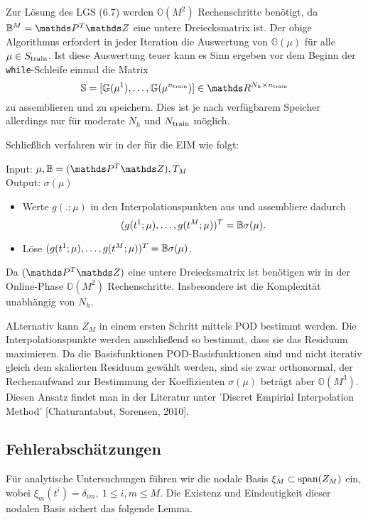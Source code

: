 Zur Lösung des LGS (6.7) werden $\mathbb{O}(M^2)$ Rechenschritte benötigt, da $\mathbb{B}^M = \Pw^T\Z$ eine untere Dreiecksmatrix ist.
Der obige Algorithmus erfordert in jeder Iteration die Auswertung von $\mathbb{G}(\mu)$ für alle $\mu\in S_{\operatorname{train}}$.
Ist diese Auswertung teuer kann es Sinn ergeben vor dem Beginn der \texttt{while}-Schleife einmal die Matrix
\[
\mathbb{S} = [\mathbb{G}(\mu^1)\dt{,}\mathbb{G}(\mu^{n_{\train}})] \in \R^{N_h\times n_{\train}}
\]
zu assemblieren und zu speichern.
Dies ist je nach verfügbarem Speicher allerdings nur für moderate $N_h$ und $N_{\operatorname{train}}$ möglich.

Schließlich verfahren wir in der  für die EIM wie folgt:

Input: $\mu, \mathbb{B} = (\Pw^T\Z), T_M$\\
Output: $\sigma(\mu)$\\
\begin{itemize}
	\item Werte $g(.;\mu)$ in den Interpolationspunkten aus und assembliere dadurch
	\[
	(g(t^1;\mu), \dots ,g(t^M;\mu))^T = \mathbb{B}\sigma(\mu).
	\]
	\item Löse $(g(t^1;\mu), \dots ,g(t^M;\mu))^T = \mathbb{B}\sigma(\mu)$.
\end{itemize}

Da $(\Pw^T\Z)$ eine untere Dreiecksmatrix ist benötigen wir in der Online-Phase $\mathbb{O}(M^2)$ Rechenschritte.
Insbesondere ist die Komplexität unabhängig von $N_h$.

ALternativ kann $Z_M$ in einem ersten Schritt mittels POD bestimmt werden.
Die Interpolationspunkte werden anschließend so bestimmt, dass sie das Residuum maximieren.
Da die Basisfunktionen POD-Basisfunktionen sind und nicht iterativ gleich dem skalierten Residuum gewählt werden, sind sie zwar orthonormal, der Rechenaufwand zur Bestimmung der Koeffizienten $\sigma(\mu)$ beträgt aber $\mathbb{O}(M^3)$.
Diesen Ansatz findet man in der Literatur unter 'Discret Empirial Interpolation Method' [Chaturantabut, Sorensen, 2010].

\subsection{Fehlerabschätzungen}
Für analytische Untersuchungen führen wir die nodale Basis $\xi_M \subset \operatorname{span}(Z_M)$ ein, wobei $\xi_m(t^i) =\delta_{im},~1\le i,m\le M$.
Die Existenz und Eindeutigkeit dieser nodalen Basis sichert das folgende Lemma.

